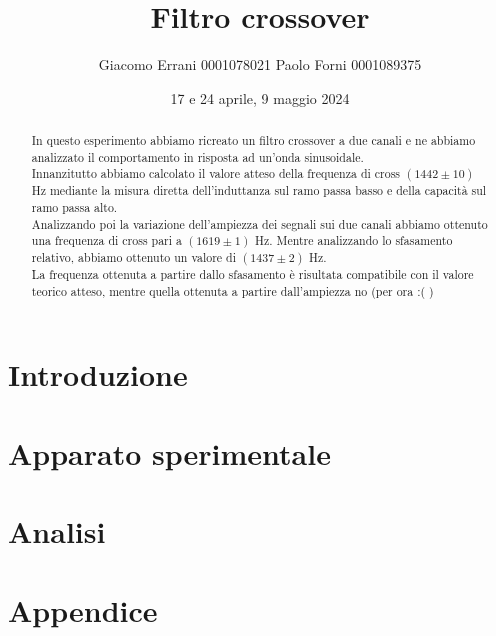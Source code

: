 \documentclass[12pt,a4paper]{article}
\title{Filtro crossover} %
\date{17 e 24 aprile, 9 maggio 2024}
\author{Giacomo Errani 0001078021 Paolo Forni 0001089375}
\newcommand{\theoryF}{ $(1442 \pm 10)$ Hz}
\newcommand{\amplitudeF}{$(1619 \pm 1)$ Hz}
\newcommand{\phaseF}{$(1437 \pm 2)$ Hz}
\begin{document}
\maketitle

\begin{abstract}

  In questo esperimento abbiamo ricreato un filtro crossover a due canali e ne abbiamo analizzato il comportamento
  in risposta ad un'onda sinusoidale. \\
  Innanzitutto abbiamo calcolato il valore atteso della frequenza di cross \theoryF \hspace{1pt} mediante la misura
  diretta dell'induttanza sul ramo passa basso e della capacità sul ramo passa alto. \\
  Analizzando poi la variazione dell'ampiezza dei segnali sui due canali abbiamo ottenuto una frequenza di cross pari a
  \amplitudeF. Mentre analizzando lo sfasamento relativo, abbiamo ottenuto un valore di \phaseF. \\
  La frequenza ottenuta a partire dallo sfasamento è risultata compatibile con il valore teorico atteso, mentre quella
  ottenuta a partire dall'ampiezza no (per ora :( )

\end{abstract}


\section{Introduzione}\label{sec:introduzione}

  


\section{Apparato sperimentale}\label{sec:apparato-sperimentale}

  


\section{Analisi}\label{sec:analisi}

  



\section*{Appendice}
  \appendix
\end{document}
